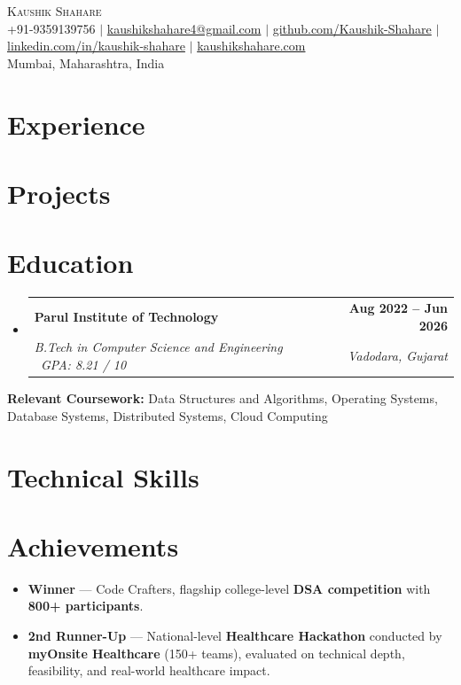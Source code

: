 \documentclass[letterpaper,11pt]{article}
\makeatletter
\newcommand{\resumeSubheading}[4]{
\item
\begin{tabular*}{1.0\textwidth}{l@{\extracolsep{\fill}}r}
\textbf{#1} & \textbf{\small #2} \\
\textit{\small #3} & \textit{\small #4}
\end{tabular*}\vspace{-6pt}
}
\newcommand{\resumeSubHeadingListStart}{\begin{itemize}[leftmargin=0in,label={}]}
\newcommand{\resumeSubHeadingListEnd}{\end{itemize}}
\makeatother
\begin{document}
\begin{center}
{\Huge \scshape Kaushik Shahare} \\ \vspace{2pt}
\small
+91-9359139756 $|$
\href{mailto:kaushikshahare4@gmail.com}{kaushikshahare4@gmail.com} $|$
\href{https://github.com/Kaushik-Shahare}{github.com/Kaushik-Shahare} $|$
\href{https://linkedin.com/in/kaushik-shahare-84bba7267/}{linkedin.com/in/kaushik-shahare} $|$
\href{https://kaushikshahare.com}{kaushikshahare.com} \\
Mumbai, Maharashtra, India
\end{center}


\section{Experience}
\resumeSubHeadingListStart


\resumeSubHeadingListEnd

\section{Projects}
\resumeSubHeadingListStart


\resumeSubHeadingListEnd

\section{Education}
\resumeSubHeadingListStart
\resumeSubheading
{Parul Institute of Technology}{Aug 2022 -- Jun 2026}
{B.Tech in Computer Science and Engineering \textbar\ GPA: 8.21 / 10}{Vadodara, Gujarat}
\resumeSubHeadingListEnd

\small{
\textbf{Relevant Coursework:} Data Structures and Algorithms, Operating Systems, Database Systems, Distributed Systems, Cloud Computing
}

\section{Technical Skills}
\small{
}


\section{Achievements}
\resumeSubHeadingListStart
\item \small{\textbf{Winner} — Code Crafters, flagship college-level \textbf{DSA competition} with \textbf{800+ participants}.}
\item \small{\textbf{2nd Runner-Up} — National-level \textbf{Healthcare Hackathon} conducted by \textbf{myOnsite Healthcare} (150+ teams), evaluated on technical depth, feasibility, and real-world healthcare impact.}
\resumeSubHeadingListEnd
\end{document}
